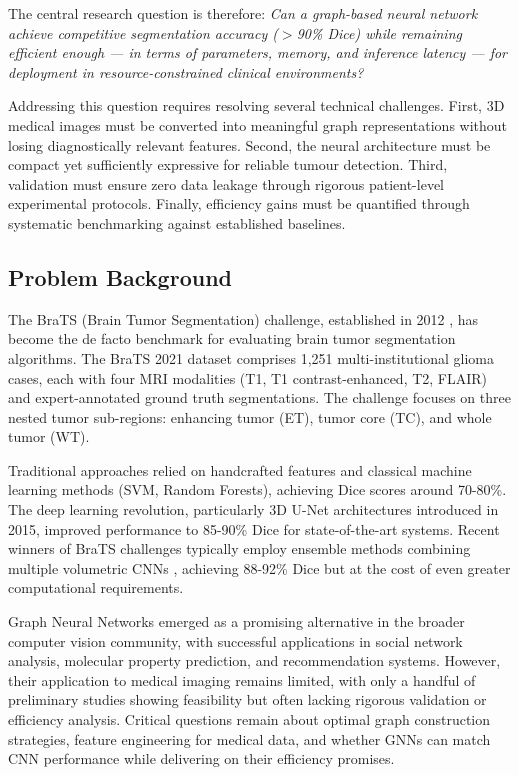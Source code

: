 \documentclass{article}
\begin{document}
The central research question is therefore: \textit{Can a graph-based neural network achieve competitive segmentation accuracy ($>$90\% Dice) while remaining efficient enough — in terms of parameters, memory, and inference latency — for deployment in resource-constrained clinical environments?}

Addressing this question requires resolving several technical challenges. First, 3D medical images must be converted into meaningful graph representations without losing diagnostically relevant features. Second, the neural architecture must be compact yet sufficiently expressive for reliable tumour detection. Third, validation must ensure zero data leakage through rigorous patient-level experimental protocols. Finally, efficiency gains must be quantified through systematic benchmarking against established baselines.

\subsection{Problem Background}

The BraTS (Brain Tumor Segmentation) challenge, established in 2012 \cite{menze2015multimodal}, has become the de facto benchmark for evaluating brain tumor segmentation algorithms. The BraTS 2021 dataset comprises 1,251 multi-institutional glioma cases, each with four MRI modalities (T1, T1 contrast-enhanced, T2, FLAIR) and expert-annotated ground truth segmentations. The challenge focuses on three nested tumor sub-regions: enhancing tumor (ET), tumor core (TC), and whole tumor (WT).

Traditional approaches relied on handcrafted features and classical machine learning methods (SVM, Random Forests), achieving Dice scores around 70-80\%. The deep learning revolution, particularly 3D U-Net architectures \cite{ronneberger2015unet, cicek20163d} introduced in 2015, improved performance to 85-90\% Dice for state-of-the-art systems. Recent winners of BraTS challenges typically employ ensemble methods combining multiple volumetric CNNs \cite{isensee2021nnunet}, achieving 88-92\% Dice but at the cost of even greater computational requirements.

Graph Neural Networks \cite{hamilton2017graphsage, kipf2017gcn} emerged as a promising alternative in the broader computer vision community, with successful applications in social network analysis, molecular property prediction, and recommendation systems. However, their application to medical imaging remains limited, with only a handful of preliminary studies showing feasibility but often lacking rigorous validation or efficiency analysis. Critical questions remain about optimal graph construction strategies, feature engineering for medical data, and whether GNNs can match CNN performance while delivering on their efficiency promises.
\end{document}

